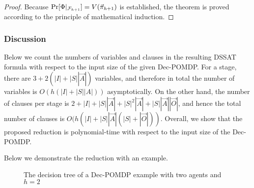 \begin{proof}
    Because $\Pr[\Phi|_{\mathcal{F}_{h+1}}]=V(\vec{\pi}_{h+1})$ is established,
    the theorem is proved according to the principle of mathematical induction.
\end{proof}

\subsubsection{Discussion}
Below we count the numbers of variables and clauses in the resulting DSSAT formula with respect to the input size of the given Dec-POMDP.
For a stage,
there are $3+2(|I|+|S||\vec{A}|)$ variables,
and therefore in total the number of variables is $O(h(|I|+|S||A|))$ asymptotically.
On the other hand,
the number of clauses per stage is $2+|I|+|S||\vec{A}|+|S|^2|\vec{A}|+|S||\vec{A}||\vec{O}|$,
and hence the total number of clauses is $O(h(|I|+|S||\vec{A}|(|S|+|\vec{O}|))$.
Overall, we show that the proposed reduction is polynomial-time with respect to the input size of the Dec-POMDP.

Below we demonstrate the reduction with an example.

\begin{figure}[t]
    \centering
    
    \caption{The decision tree of a Dec-POMDP example with two agents and $h=2$}
    \label{fig:dssat-dec-pomdp-example}
\end{figure}

